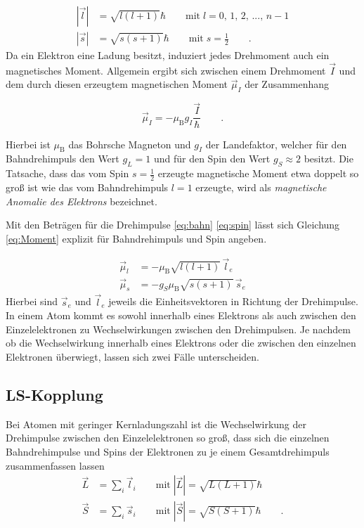 \begin{align}
|\vec{l}| & = \sqrt{l(l+1)}\hbar \qquad \text{mit} \; l = 0,\, 1,\, 2,\, ... ,\, n-1 \label{eq:bahn}\\
|\vec{s}| & = \sqrt{s(s+1)}\hbar \qquad \text{mit} \; s = \frac{1}{2} \qquad . \label{eq:spin}
\end{align}
Da ein Elektron eine Ladung besitzt, induziert jedes Drehmoment auch ein magnetisches Moment. Allgemein ergibt sich zwischen einem Drehmoment $\vec{I}$ und dem durch diesen erzeugtem magnetischen
Moment $\vec{\mu}_I$ der Zusammenhang

\begin{equation}
\vec{\mu}_I = - \mu_{\text{B}}g_I\frac{\vec{I}}{\hbar} \qquad . \label{eq:Moment}
\end{equation}

Hierbei ist $\mu_\text{B}$ das Bohrsche Magneton und $g_I$ der Landefaktor, welcher für den Bahndrehimpuls den Wert $g_L=1$ und für den Spin den Wert $g_S \approx 2$ besitzt.
Die Tatsache, dass das vom Spin $s=\frac{1}{2}$ erzeugte magnetische Moment etwa doppelt so groß ist wie das vom Bahndrehimpuls $l=1$ erzeugte, wird als \textit{magnetische Anomalie des Elektrons}
bezeichnet.

Mit den Beträgen für die Drehimpulse \eqref{eq:bahn} \eqref{eq:spin} lässt sich Gleichung \eqref{eq:Moment} explizit für Bahndrehimpuls und Spin angeben. 

\begin{align}
\vec{\mu}_l &= - \mu_{\text{B}}\sqrt{l(l+1)}\,\vec{l}_e \\
\vec{\mu}_s &= - g_S \mu_{\text{B}}\sqrt{s(s+1)}\,\vec{s}_e
\end{align}
Hierbei sind $\vec{s}_e$ und $\vec{l}_e$ jeweils die Einheitsvektoren in Richtung der Drehimpulse.
\\

In einem Atom kommt es sowohl innerhalb eines Elektrons als auch zwischen den Einzelelektronen zu Wechselwirkungen zwischen den Drehimpulsen.
Je nachdem ob die Wechselwirkung innerhalb eines Elektrons oder die zwischen den einzelnen Elektronen überwiegt, lassen sich zwei Fälle unterscheiden.

\subsection*{LS-Kopplung}
Bei Atomen mit geringer Kernladungszahl ist die Wechselwirkung der Drehimpulse zwischen den Einzelelektronen so groß, dass sich die einzelnen Bahndrehimpulse und Spins der Elektronen zu je einem Gesamtdrehimpuls
zusammenfassen lassen
\begin{align}
\vec{L} &= \sum_i \vec{l}_i \qquad \text{mit}\; |\vec{L}| = \sqrt{L(L+1)}\hbar \\
\vec{S} &= \sum_i \vec{s}_i \qquad \text{mit}\; |\vec{S}| = \sqrt{S(S+1)}\hbar \qquad .
\end{align}

